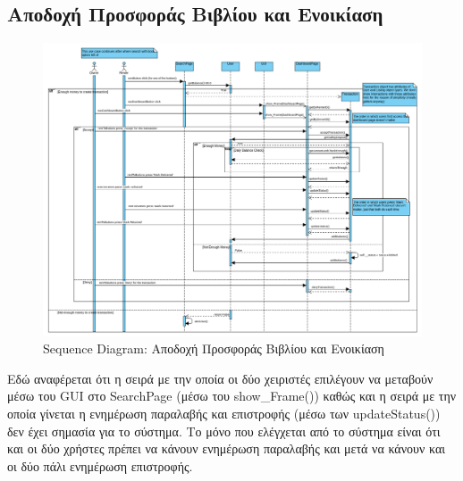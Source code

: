 \documentclass[12pt,a4paper]{article}
\begin{document}
\subsection{Αποδοχή Προσφοράς Βιβλίου και Ενοικίαση}
\begin{figure}[H]
	\includegraphics[width=\textwidth]{Accept Book Offer and Rent Sequence.png}
	\caption{Sequence Diagram: Αποδοχή Προσφοράς Βιβλίου και Ενοικίαση}
	\label{Sequence Diagram: Αποδοχή Προσφοράς Βιβλίου και Ενοικίαση}
\end{figure}

\label{Rent}

Εδώ αναφέρεται ότι η σειρά με την οποία οι δύο χειριστές επιλέγουν να μεταβούν μέσω του GUI στο SearchPage (μέσω του show\_Frame()) καθώς και η σειρά με την οποία γίνεται η ενημέρωση παραλαβής και επιστροφής (μέσω των updateStatus()) δεν έχει σημασία για το σύστημα. Το μόνο που ελέγχεται από το σύστημα είναι ότι και οι δύο χρήστες πρέπει να κάνουν ενημέρωση παραλαβής και μετά να κάνουν και οι δύο πάλι ενημέρωση επιστροφής.
\end{document}
